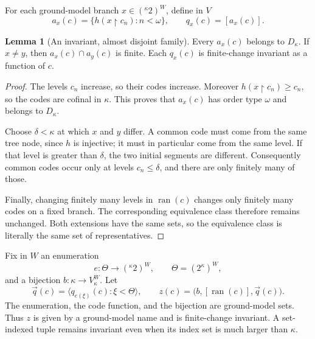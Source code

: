 \documentclass[11pt,letterpaper]{article}
\theoremstyle{definition}
\newtheorem{lemma}[definition]{Lemma}
\numberwithin{equation}{section}
\newcommand{\restr}{\mathbin{\upharpoonright}}
\begin{document}
For each ground-model branch $x\in({}^\kappa2)^W$, define in $V$
\begin{equation}\label{eq:branchseq}
 a_x(c)=\{h(x\restr c_n):n<\omega\},\qquad q_x(c)=[a_x(c)].
\end{equation}

\begin{lemma}[An invariant, almost disjoint family]\label{lem:branches}
Every $a_x(c)$ belongs to $D_\kappa$. If $x\ne y$, then $a_x(c)\cap a_y(c)$ is finite. Each $q_x(c)$ is finite-change invariant as a function of $c$.
\end{lemma}
\begin{proof}
The levels $c_n$ increase, so their codes increase. Moreover $h(x\restr c_n)\ge c_n$, so the codes are cofinal in $\kappa$. This proves that $a_x(c)$ has order type $\omega$ and belongs to $D_\kappa$.

Choose $\delta<\kappa$ at which $x$ and $y$ differ. A common code must come from the same tree node, since $h$ is injective; it must in particular come from the same level. If that level is greater than $\delta$, the two initial segments are different. Consequently common codes occur only at levels $c_n\le\delta$, and there are only finitely many of those.

Finally, changing finitely many levels in $\operatorname{ran}(c)$ changes only finitely many codes on a fixed branch. The corresponding equivalence class therefore remains unchanged. Both extensions have the same sets, so the equivalence class is literally the same set of representatives.
\end{proof}

Fix in $W$ an enumeration
\[
 e:\Theta\longrightarrow({}^\kappa2)^W,
 \qquad \Theta=(2^\kappa)^W,
\]
and a bijection $b:\kappa\to V_\kappa^W$. Let
\begin{equation}\label{eq:jointparameter}
 \vec q(c)=\langle q_{e(\xi)}(c):\xi<\Theta\rangle,
 \qquad
 z(c)=\bigl(b,[\operatorname{ran}(c)],\vec q(c)\bigr).
\end{equation}
The enumeration, the code function, and the bijection are ground-model sets. Thus $z$ is given by a ground-model name and is finite-change invariant. A set-indexed tuple remains invariant even when its index set is much larger than $\kappa$.
\end{document}
